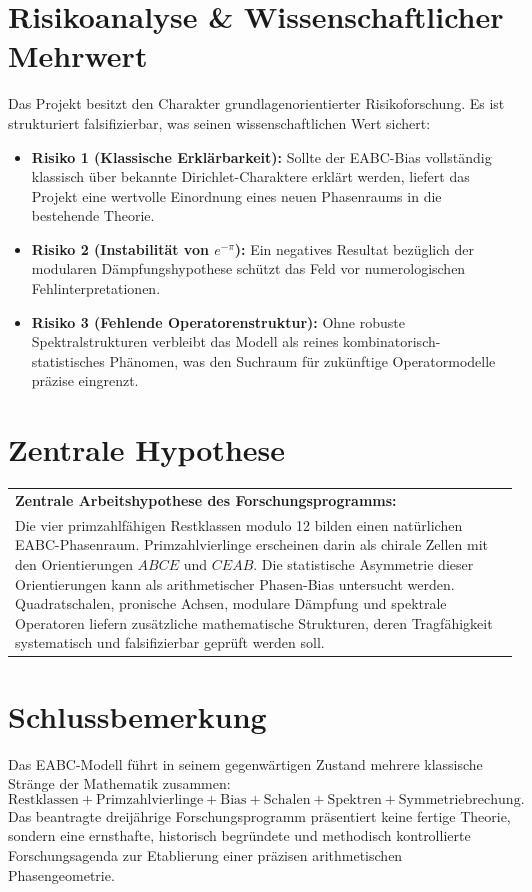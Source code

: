 \documentclass[11pt,a4paper,bibliography=totoc]{scrartcl}
\begin{document}
	\section{Risikoanalyse \& Wissenschaftlicher Mehrwert}
	Das Projekt besitzt den Charakter grundlagenorientierter Risikoforschung. Es ist strukturiert falsifizierbar, was seinen wissenschaftlichen Wert sichert:
	\begin{itemize}
		\item \textbf{Risiko 1 (Klassische Erklärbarkeit):} Sollte der EABC-Bias vollständig klassisch über bekannte Dirichlet-Charaktere erklärt werden, liefert das Projekt eine wertvolle Einordnung eines neuen Phasenraums in die bestehende Theorie.
		\item \textbf{Risiko 2 (Instabilität von $e^{-\pi}$):} Ein negatives Resultat bezüglich der modularen Dämpfungshypothese schützt das Feld vor numerologischen Fehlinterpretationen.
		\item \textbf{Risiko 3 (Fehlende Operatorenstruktur):} Ohne robuste Spektralstrukturen verbleibt das Modell als reines kombinatorisch-statistisches Phänomen, was den Suchraum für zukünftige Operatormodelle präzise eingrenzt.
	\end{itemize}
	
	\section{Zentrale Hypothese}
	
	\begin{center}
		\renewcommand{\arraystretch}{1.5}
		\begin{tabular}{|p{}|}
			\hline
			\textbf{Zentrale Arbeitshypothese des Forschungsprogramms:} \\
			Die vier primzahlfähigen Restklassen modulo 12 bilden einen natürlichen EABC-Phasenraum. Primzahlvierlinge erscheinen darin als chirale Zellen mit den Orientierungen $ABCE$ und $CEAB$. Die statistische Asymmetrie dieser Orientierungen kann als arithmetischer Phasen-Bias untersucht werden. Quadratschalen, pronische Achsen, modulare Dämpfung und spektrale Operatoren liefern zusätzliche mathematische Strukturen, deren Tragfähigkeit systematisch und falsifizierbar geprüft werden soll. \\
			\hline
		\end{tabular}
	\end{center}
	
	\section{Schlussbemerkung}
	Das EABC-Modell führt in seinem gegenwärtigen Zustand mehrere klassische Stränge der Mathematik zusammen:
	\[
	\text{Restklassen} + \text{Primzahlvierlinge} + \text{Bias} + \text{Schalen} + \text{Spektren} + \text{Symmetriebrechung}.
	\]
	Das beantragte dreijährige Forschungsprogramm präsentiert keine fertige Theorie, sondern eine ernsthafte, historisch begründete und methodisch kontrollierte Forschungsagenda zur Etablierung einer präzisen arithmetischen Phasengeometrie.
	
\end{document}
